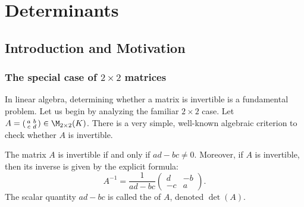 \setcounter{chapter}{19} %
\chapter{Determinants}
\section{Introduction and Motivation}

\subsection{The special case of \texorpdfstring{$2 \times 2$}{2x2} matrices}
In linear algebra, determining whether a matrix is invertible is a fundamental problem. Let us begin by analyzing the familiar $2 \times 2$ case. Let $A = (\begin{smallmatrix} a & b \\ c & d \end{smallmatrix}) \in \M_{2 \times 2}(K)$. There is a very simple, well-known algebraic criterion to check whether $A$ is invertible.

\begin{proposition}\label{prop:inv_2x2}
  The matrix $A$ is invertible if and only if $ad - bc \neq 0$. Moreover, if $A$ is invertible, then its inverse is given by the explicit formula:
  \[
  A^{-1} = \frac{1}{ad - bc} \begin{pmatrix} d & -b \\ -c & a \end{pmatrix}.
  \]
  The scalar quantity $ad - bc$ is called the  of $A$, denoted $\det(A)$.
\end{proposition}


